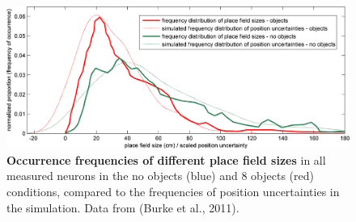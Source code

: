 \begin{figure}[!ht]
	\begin{center}
		\includegraphics[width=\textwidth]{img/burkefreqdist}
	\end{center}
	\caption[Occurrence frequencies of different place field sizes compared to those of position uncertainties in the model]{
		{\bf Occurrence frequencies of different place field sizes} in all measured neurons in the no
		objects (blue) and 8 objects (red) conditions, compared to the frequencies of position uncertainties in
		the simulation. Data from (Burke et al., 2011). 
	}
	\label{distr}
\end{figure}



%
%
%
%
%
%
%
%
%
%

%